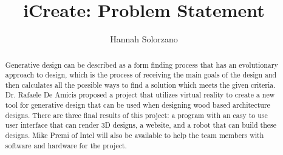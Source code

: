 \documentclass[letterpaper,draftclsnofoot,onecolumn,10 pt]{IEEEtran}
\title{iCreate: Problem Statement}
\author{Hannah Solorzano}
\begin{document}
\maketitle

\begin{abstract}
	Generative design can be described as a form finding process that has an evolutionary approach to design, which is the process of receiving the main goals of the design and then calculates all the possible ways to find a solution which meets the given criteria.  Dr. Rafaele De Amicis proposed a project that utilizes virtual reality to create a new tool for generative design that can be used when designing wood based architecture designs. There are three final results of this project: a program with an easy to use user interface that can render 3D designs, a website, and a robot that can build these designs.  Mike Premi of Intel will also be available to help the team members with software and hardware for the project.

\end{abstract}
\end{document}
